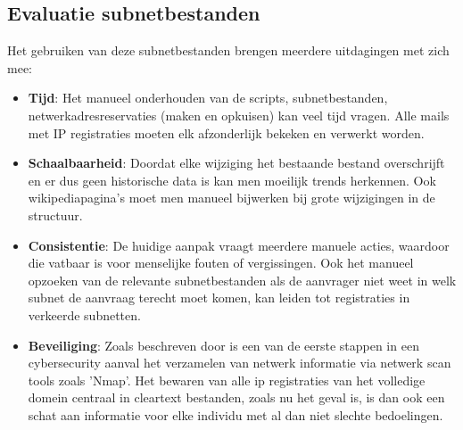 \subsection{Evaluatie subnetbestanden}
Het gebruiken van deze subnetbestanden brengen meerdere uitdagingen met zich mee:
\begin{itemize}
    \item \textbf{Tijd}: Het manueel onderhouden van de scripts, subnetbestanden, netwerkadresreservaties (maken en opkuisen) kan veel tijd vragen. Alle mails met IP registraties moeten elk afzonderlijk bekeken en verwerkt worden.
    \item \textbf{Schaalbaarheid}: Doordat elke wijziging het bestaande bestand overschrijft en er dus geen historische data is kan men moeilijk trends herkennen. Ook wikipediapagina's moet men manueel bijwerken bij grote wijzigingen in de structuur.
    \item \textbf{Consistentie}: De huidige aanpak vraagt meerdere manuele acties, waardoor die vatbaar is voor menselijke fouten of vergissingen. Ook het manueel opzoeken van de relevante subnetbestanden als de aanvrager niet weet in welk subnet de aanvraag terecht moet komen, kan leiden tot registraties in verkeerde subnetten.  
    \item \textbf{Beveiliging}: Zoals beschreven door \textcite{Liao2020} is een van de eerste stappen in een cybersecurity aanval het verzamelen van netwerk informatie via netwerk scan tools zoals 'Nmap'. Het bewaren van alle \acrshort{ip} registraties van het volledige domein centraal in cleartext bestanden, zoals nu het geval is, is dan ook een schat aan informatie voor elke individu met al dan niet slechte bedoelingen.
\end{itemize}


